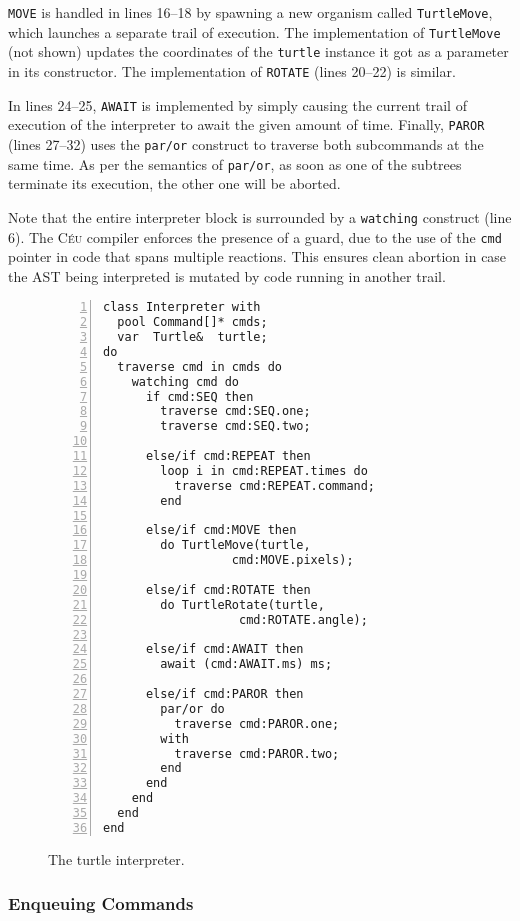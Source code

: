 \documentclass{acm_proc_article-sp}
\newcommand{\CEU}{\textsc{C\'{e}u}\xspace}
\newcommand{\code}[1] {{\small{\texttt{#1}}}}
\begin{document}
\code{MOVE} is handled in lines 16--18 by spawning a new organism called
\code{TurtleMove}, which launches a separate trail of execution. The
implementation of \code{TurtleMove} (not shown) updates the coordinates of the
\code{turtle} instance it got as a parameter in its constructor. The
implementation of \code{ROTATE} (lines 20--22) is similar.

In lines 24--25, \code{AWAIT} is implemented by simply causing the current
trail of execution of the interpreter to await the given amount of time.
Finally, \code{PAROR} (lines 27--32) uses the \code{par/or} construct
to traverse both subcommands at the same time. As per the semantics of
\code{par/or}, as soon as one of the subtrees terminate its execution,
the other one will be aborted.

Note that the entire interpreter block is surrounded by a \code{watching}
construct (line 6). The \CEU compiler enforces the presence of a guard, 
due to the use of the \code{cmd} pointer in code that spans multiple
reactions. This ensures clean abortion in case the AST being interpreted
is mutated by code running in another trail.

\begin{figure}%
\begin{lstlisting}[numbers=left,xleftmargin=3em]
class Interpreter with
  pool Command[]* cmds;
  var  Turtle&  turtle;
do
  traverse cmd in cmds do
    watching cmd do
      if cmd:SEQ then
        traverse cmd:SEQ.one;
        traverse cmd:SEQ.two;

      else/if cmd:REPEAT then
        loop i in cmd:REPEAT.times do
          traverse cmd:REPEAT.command;
        end

      else/if cmd:MOVE then
        do TurtleMove(turtle,
                  cmd:MOVE.pixels);

      else/if cmd:ROTATE then
        do TurtleRotate(turtle,
                   cmd:ROTATE.angle);

      else/if cmd:AWAIT then
        await (cmd:AWAIT.ms) ms;

      else/if cmd:PAROR then
        par/or do
          traverse cmd:PAROR.one;
        with
          traverse cmd:PAROR.two;
        end
      end
    end
  end
end
\end{lstlisting}
\caption{ The turtle interpreter.
\label{lst.turtle.interpreter}
}
\end{figure}

\subsubsection{Enqueuing Commands}
\end{document}
